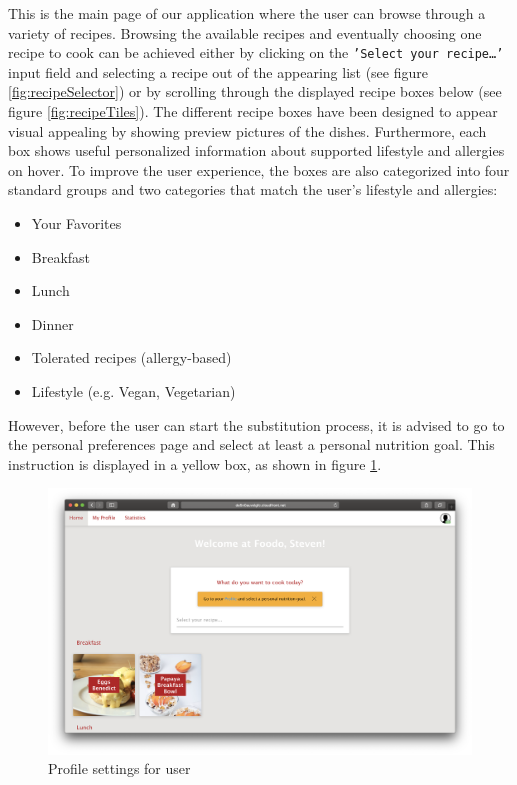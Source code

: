 \vspace{-2em}
This is the main page of our application where the user can browse through a variety of recipes. Browsing the available recipes and eventually choosing one recipe to cook can be achieved either by clicking on the \texttt{'Select your recipe…'} input field and selecting a recipe out of the appearing list (see figure \ref{fig:recipeSelector}) or by scrolling through the displayed recipe boxes below (see figure \ref{fig:recipeTiles}). The different recipe boxes have been designed to appear visual appealing by showing preview pictures of the dishes. Furthermore, each box shows useful personalized information about supported lifestyle and allergies on hover. To improve the user experience, the boxes are also categorized into four standard groups and two categories that match the user's lifestyle and allergies:
\begin{itemize}
\item Your Favorites
\item Breakfast
\item Lunch
\item Dinner
\item Tolerated recipes (allergy-based)
\item Lifestyle (e.g. Vegan, Vegetarian)
\end{itemize}	
However, before the user can start the substitution process, it is advised to go to the personal preferences page and select at least a personal nutrition goal. This instruction is displayed in a yellow box, as shown in figure \ref{fig:profilesetting}.

\vspace{-1em}
\begin{figure}[H]
	\captionsetup{justification=centering}
	\centering
	\includegraphics[scale=0.30]{Ressourcen/img/screenshots/screenshot41.png}
	\vspace{-3em}
	\caption{Profile settings for user}
	\label{fig:profilesetting}
\end{figure}

